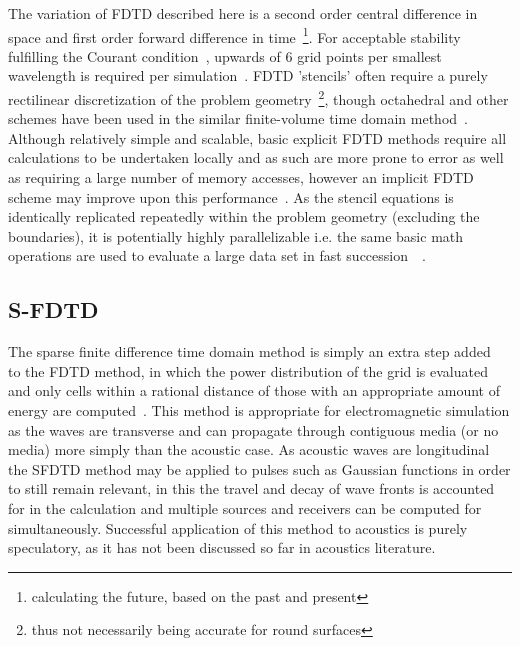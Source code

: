 \documentclass{svproc}
\begin{document}
The variation of FDTD described here is a second order central difference in space and first order forward difference in time~\footnote{calculating the future, based on the past and present}. For acceptable stability fulfilling the Courant condition~\cite{Abdulkadir2015}, upwards of 6 grid points per smallest wavelength is required per simulation~\cite{Oxnard2015}. FDTD 'stencils' often require a purely rectilinear discretization of the problem geometry~\footnote{thus not necessarily being accurate for round surfaces}, though octahedral and other schemes have been used in the similar finite-volume time domain method~\cite{Bilbao2016}. Although relatively simple and scalable, basic explicit FDTD methods require all calculations to be undertaken locally and as such are more prone to error as well as requiring a large number of memory accesses, however an implicit FDTD scheme may improve upon this performance~\cite{Hamilton2014}. As the stencil equations is identically replicated repeatedly within the problem geometry (excluding the boundaries), it is potentially highly parallelizable i.e. the same basic math operations are used to evaluate a large data set in fast succession~\cite{Savioja2010}~\cite{Angus2010}.

\subsection{S-FDTD}
The sparse finite difference time domain method is simply an extra step added~\cite{excluding some extra boundary handling to ensure stability} to the FDTD method, in which the power distribution of the grid is evaluated and only cells within a rational distance of those with an appropriate amount of energy are computed~\cite{Doerr2013}. This method is appropriate for electromagnetic simulation as the waves are transverse and can propagate through contiguous media (or no media) more simply than the acoustic case. As acoustic waves are longitudinal the SFDTD method may be applied to pulses such as Gaussian functions in order to still remain relevant, in this the travel and decay of wave fronts is accounted for in the calculation and multiple sources and receivers can be computed for simultaneously. Successful application of this method to acoustics is purely speculatory, as it has not been discussed so far in acoustics literature. 
\end{document}
